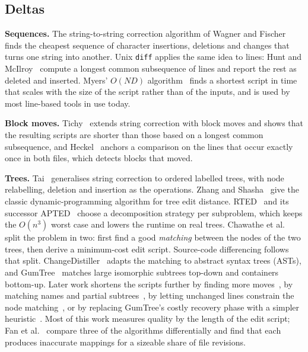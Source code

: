 \documentclass[sigconf,review]{acmart}
\begin{document}
\subsection{Deltas}
\label{sec:deltas}

\textbf{Sequences.} The string-to-string correction algorithm of Wagner and
Fischer~\cite{wagner-fischer-1974} finds the cheapest sequence of character insertions,
deletions and changes that turns one string into another.
Unix \texttt{diff} applies the same idea to lines: Hunt and McIlroy~\cite{hunt-mcilroy-1976}
compute a longest common subsequence of lines and report the rest as deleted and
inserted. Myers' $O(ND)$ algorithm~\cite{myers-1986} finds a shortest script in time that
scales with the size of the script rather than of the inputs, and is used by most line-based tools
in use today.

\textbf{Block moves.} Tichy~\cite{tichy-1984} extends string correction with block moves and shows that the
resulting scripts are shorter than those based on a longest common subsequence, and
Heckel~\cite{heckel-1978} anchors a comparison on the lines that occur exactly once in both files,
which detects blocks that moved.

\textbf{Trees.} Tai~\cite{tai-1979} generalises string correction to ordered labelled trees, with
node relabelling, deletion and insertion as the operations. Zhang and
Shasha~\cite{zhang-shasha-1989} give the classic dynamic-programming algorithm for tree edit
distance. RTED~\cite{rted-2011} and its successor APTED~\cite{apted-2015} choose a decomposition strategy
per subproblem, which keeps the $O(n^3)$ worst case and lowers the runtime on real trees.
Chawathe et al.~\cite{chawathe-1996} split
the problem in two: first find a good \emph{matching} between the
nodes of the two trees, then derive a minimum-cost edit script. Source-code differencing follows that split.
ChangeDistiller~\cite{changedistiller-2007} adapts the matching to abstract syntax trees (ASTs),
and GumTree~\cite{gumtreediff-2014} matches large isomorphic subtrees top-down and containers
bottom-up. Later work shortens the scripts further by finding more moves~\cite{mtdiff-2016}, by
matching names and partial subtrees~\cite{ijm-2018}, by letting unchanged lines constrain the node
matching~\cite{matsumoto-2019}, or by replacing GumTree's costly recovery phase with a simpler
heuristic~\cite{falleri-2024}. Most of this work measures quality by the length of the edit
script; Fan et al.~\cite{fan-2021} compare three of the algorithms differentially and find that
each produces inaccurate mappings for a sizeable share of file revisions.
\end{document}
